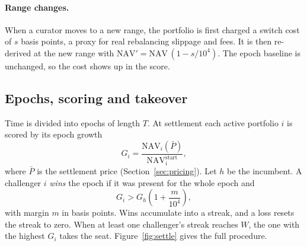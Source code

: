 \documentclass[11pt,a4paper]{article}
\newcommand{\NAV}{\mathrm{NAV}}
\begin{document}
\paragraph{Range changes.} When a curator moves to a new range, the portfolio is first charged a switch cost of $s$ basis points, a proxy for real rebalancing slippage and fees. It is then re-derived at the new range with $\NAV' = \NAV\,(1 - s/10^4)$. The epoch baseline is unchanged, so the cost shows up in the score.

\subsection{Epochs, scoring and takeover}
Time is divided into epochs of length $T$. At settlement each active portfolio $i$ is scored by its epoch growth
\begin{equation}
  G_i = \frac{\NAV_i(\bar P)}{\NAV_i^{\text{start}}},
\end{equation}
where $\bar P$ is the settlement price (Section~\ref{sec:pricing}). Let $h$ be the incumbent. A challenger $i$ \emph{wins} the epoch if it was present for the whole epoch and
\begin{equation}
  G_i > G_h \left(1 + \frac{m}{10^4}\right),
\end{equation}
with margin $m$ in basis points. Wins accumulate into a streak, and a loss resets the streak to zero. When at least one challenger's streak reaches $W$, the one with the highest $G_i$ takes the seat. Figure~\ref{fig:settle} gives the full procedure.
\end{document}
